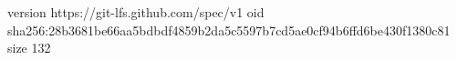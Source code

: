 version https://git-lfs.github.com/spec/v1
oid sha256:28b3681be66aa5bdbdf4859b2da5c5597b7cd5ae0cf94b6ffd6be430f1380c81
size 132
